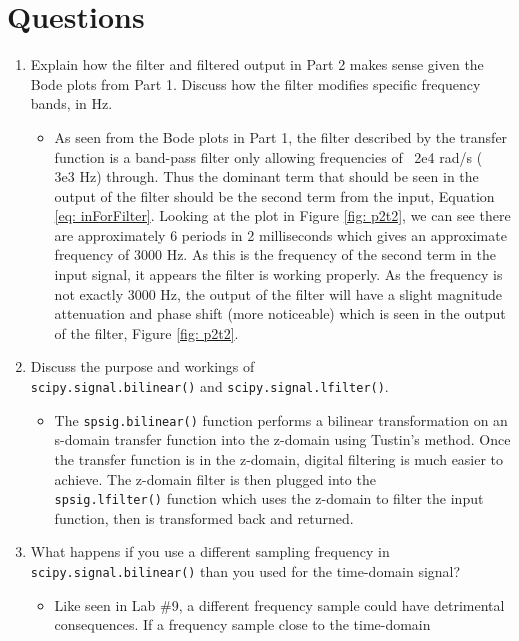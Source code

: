 \documentclass[12pt]{report}
\begin{document}
\section{Questions}\label{section: Questions}
\begin{enumerate}
  \item Explain how the filter and filtered output in Part 2 makes sense given the Bode plots from Part 1. Discuss how the filter modifies specific frequency bands, in Hz.
  \begin{itemize}
    \item As seen from the Bode plots in Part 1, the filter described by the transfer function is a band-pass filter only allowing frequencies of ~2e4 rad/s (~ 3e3 Hz) through.
    Thus the dominant term that should be seen in the output of the filter should be the second term from the input, Equation \eqref{eq: inForFilter}.
    Looking at the plot in Figure \ref{fig: p2t2}, we can see there are approximately 6 periods in 2 milliseconds which gives an approximate frequency of 3000 Hz.
    As this is the frequency of the second term in the input signal, it appears the filter is working properly. As the frequency is not exactly 3000 Hz, the
    output of the filter will have a slight magnitude attenuation and phase shift (more noticeable) which is seen in the output of the filter, Figure \ref{fig: p2t2}. 
  \end{itemize}
  \item Discuss the purpose and workings of \\\texttt{scipy.signal.bilinear()} and \texttt{scipy.signal.lfilter()}.
  \begin{itemize}
    \item The \texttt{spsig.bilinear()} function performs a bilinear transformation on an s-domain transfer function into the z-domain using Tustin's method.
    Once the transfer function is in the z-domain, digital filtering is much easier to achieve. The z-domain filter is then plugged into the \\\texttt{spsig.lfilter()}
    function which uses the z-domain to filter the input function, then is transformed back and returned.
  \end{itemize}
  \item What happens if you use a different sampling frequency in \\\texttt{scipy.signal.bilinear()} than you used for the time-domain signal?
  \begin{itemize}
    \item Like seen in Lab \#9, a different frequency sample could have detrimental consequences. If a frequency sample close to the time-domain

\end{itemize}
\end{enumerate}
\end{document}
